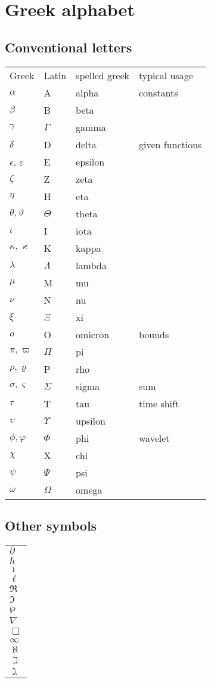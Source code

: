 \chapter{Greek alphabet}

\section{Conventional letters}
\begin{longtable}{l| l| l| l} 
    Greek & Latin & spelled greek & typical usage \\
    $\alpha$ & A & alpha & constants \\
    $\beta$ & B & beta & \\
    $\gamma$ & $\Gamma$  & gamma & \\
    $\delta$ & D  & delta & given functions  \\
    $\epsilon$, $\varepsilon$ & E & epsilon & \\
    $\zeta$ & Z & zeta & \\
    $\eta$ & H & eta & \\
    $\theta, \vartheta$ & $\Theta$ & theta & \\
    $\iota$ & I & iota & \\
    $\kappa, \varkappa$ & K & kappa & \\
    $\lambda$ & $\Lambda$ & lambda & \\
    $\mu$ & M & mu & \\
    $\nu$ & N & nu & \\
    $\xi$ & $\Xi$ & xi & \\
    $o$ & O & omicron & bounds \\
    $\pi, \varpi$ & $\Pi$ & pi & \\
    $\rho, \varrho $ & P & rho & \\
    $\sigma, \varsigma$ & $\Sigma$ & sigma & sum \\
    $\tau$ & T & tau &  time shift\\
    $\upsilon$ & $\Upsilon$ & upsilon & \\
    $\phi, \varphi$ & $\Phi$ & phi & wavelet \\
    $\chi$ & X & chi & \\
    $\psi$ & $\Psi$ & psi & \\
    $\omega$ & $\Omega$ & omega & \\
\end{longtable}

\section{Other symbols}
\begin{longtable}{l}
    $\partial$ \\
    $\hbar$ \\
    $\imath$ \\
    $\ell$ \\
    $\Re$ \\
    $\Im$ \\
    $\wp$ \\
    $\nabla$ \\
    $\Box$ \\
    $\infty$ \\
    $\aleph$ \\
    $\beth$ \\
    $\gimel$ \\

\end{longtable}
